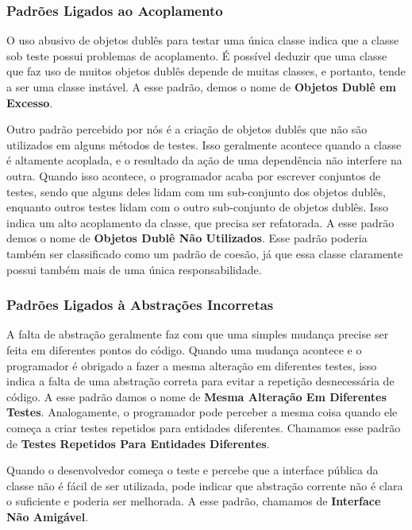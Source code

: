 \documentclass[conference]{IEEEtran}
\begin{document}
\subsubsection{Padrões Ligados ao Acoplamento}

O uso abusivo de objetos dublês para testar uma
única classe indica que a classe sob teste possui problemas
de acoplamento. É possível deduzir que uma classe que faz uso de muitos
objetos dublês depende de muitas classes, e portanto, tende a ser
uma classe instável. A esse padrão, demos o nome de \textbf{Objetos Dublê em Excesso}.

Outro padrão percebido por nós é a criação de objetos dublês que não
são utilizados em alguns métodos de testes. Isso geralmente acontece quando
a classe é altamente acoplada, e o resultado da ação de uma dependência não
interfere na outra. Quando isso acontece, o programador acaba por escrever
conjuntos de testes, sendo que alguns deles lidam com um sub-conjunto dos objetos dublês,
enquanto outros testes lidam com o outro sub-conjunto de objetos dublês. 
Isso indica um alto acoplamento 
da classe, que precisa ser refatorada. A esse padrão demos o nome de
\textbf{Objetos Dublê Não Utilizados}. Esse padrão poderia também ser classificado
como um padrão de coesão, já que essa classe claramente possui também mais de uma
única responsabilidade.

\subsubsection{Padrões Ligados à Abstrações Incorretas}

A falta de abstração geralmente faz com que uma simples mudança precise
ser feita em diferentes pontos do código. Quando uma mudança acontece e 
o programador é obrigado a fazer a mesma alteração em diferentes testes,
isso indica a falta de uma abstração correta para evitar a 
repetição desnecessária de código.
A esse padrão damos o nome de \textbf{Mesma Alteração Em Diferentes Testes}.
Analogamente, o programador pode perceber a mesma coisa
quando ele começa a criar testes repetidos para entidades diferentes.
Chamamos esse padrão de \textbf{Testes Repetidos Para Entidades Diferentes}.

Quando o desenvolvedor começa o teste e percebe que a interface pública da classe
não é fácil de ser utilizada, pode indicar que abstração
corrente não é clara o suficiente e poderia ser melhorada. A esse padrão,
chamamos de \textbf{Interface Não Amigável}.
\end{document}
